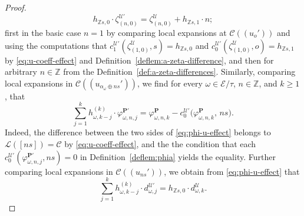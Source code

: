 \documentclass[10pt,a4paper]{amsart}
\newcommand{\Ca}{\mathcal{C}} %
\newcommand{\Z}{\mathbb{Z}} %
\newcommand{\ec}{\mathcal{E}} %
\newcommand{\idec}{{o}} %
\newcommand{\orbita}{{\ec/\tau}} %
\newcommand{\za}[2]{\zeta^{\mathcal{U}}_{( {#1} , {#2} )}}
\begin{document}
\begin{proof}
 \begin{equation}\label{eq:zeta-u-effect}
        h_{\Z s,0}\cdot\zeta^{\mathcal{U}'}_{(n,0)}=\za{n}{0}+h_{\Z s,1}\cdot n;
    \end{equation}
    first in the basic case $n=1$ by comparing local expansions at $\Ca ((u_\idec'))$ and using the computations that $c_1^{\mathcal{U}'}(\za{1}{0},s)=h_{\Z s,0}$ and $c_0^{\mathcal{U}'}(\za{1}{0},\idec)=h_{\Z s,1}$ by \eqref{eq:u-coeff-effect} and Definition~\ref{deflem:a-zeta-difference}, and then for arbitrary $n\in\Z$ from the Definition~\ref{def:a-zeta-differences}. Similarly, comparing local expansions in $\Ca((u_{\alpha_\omega\oplus ns}'))$, we find for every $\omega\in\orbita$, $n\in\Z$, and $k\geq 1$, that
    \begin{equation}\label{eq:phi-u-effect}
        \sum_{j=1}^k h^{(k)}_{\omega,k-j}\cdot\varphi^{\mathbf{P}'}_{\omega,n,j}=\varphi^\mathbf{P}_{\omega,n,k}-c^{\mathcal{U}'}_0\bigl(\varphi^\mathbf{P}_{\omega,n,k},\,ns\bigr).
    \end{equation} Indeed, the difference between the two sides of \eqref{eq:phi-u-effect} belongs to $\mathcal{L}([ns])=\Ca$ by \eqref{eq:u-coeff-effect}, and the the condition that each $c^{\mathcal{U}'}_0(\varphi^{\mathbf{P}'}_{\omega,n,j},ns)=0$ in Definition~\ref{deflem:phia} yields the equality.
    Further comparing local expansions in $\Ca((u_{ns}'))$, we obtain from \eqref{eq:phi-u-effect} that \begin{equation}\label{eq:d-u-effect}
    \sum_{j=1}^k h^{(k)}_{\omega,k-j}\cdot d^{\mathcal{U}'}_{\omega,j}=h_{\Z s,0}\cdot d^\mathcal{U}_{\omega,k}.
    \end{equation} 



\end{proof}
\end{document}
